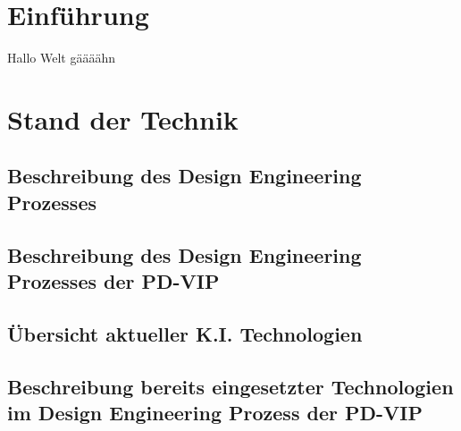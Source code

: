 \documentclass[11pt,a4paper,english]{article} %
\begin{document}
\section{Einführung}
\begin{comment}
- Thema und Aufgabenstellung
  ○ Thema
    § Aktuelle bzw. Historische Bezüge herstellen
    § Größeren Bezugsrahmen darstellen
      □ Vom allg. Meinen auf meine Aufgabenstellung kommen
  ○ Aufgabenstellung
    § Wichtigste Punkte aus der offiziellen Aufgabenstellung mit der eigenen Formulierung umschreiben (ggf. Offizielle AGST in die Arbeit einfügen)
    § Ziele der Untersuchung mit themenrelevanten Teilfragen
    § Abgrenzung des Untersuchungsgegenstandes mit Begründung
- Vorgehensweise
  ○ Gang der Untersuchung darlegen
    § Welche Schritte bin ich gegangen um an mein Ziel zu kommen
  ○ Vorgehensweise darlegen (Orientierung an der Gliederung)
  ○ Begründung zur Vorgehensweise liefern
    § Input warum ich so und nicht anders vorgegangen bin
- Ausschluss/ Eingrenzung
  ○ Beschreiben welche Themengebiete nich behandelt werden
    § Begründen
  ○ Relevanz des Themas unterstreichen
  ○ Nach Fertigstellung der Arbeit
    § Erneut prüfen
\end{comment}
Hallo Welt gäääähn \parencite[vgl.][S. 100]{Reich2013}
\newpage
\section{Stand der Technik}

\subsection{Beschreibung des Design Engineering Prozesses}

\subsection{Beschreibung des Design Engineering Prozesses der PD-VIP}

\subsection{Übersicht aktueller K.I. Technologien}

\subsection{Beschreibung bereits eingesetzter Technologien im Design Engineering Prozess der PD-VIP}
\end{document}
